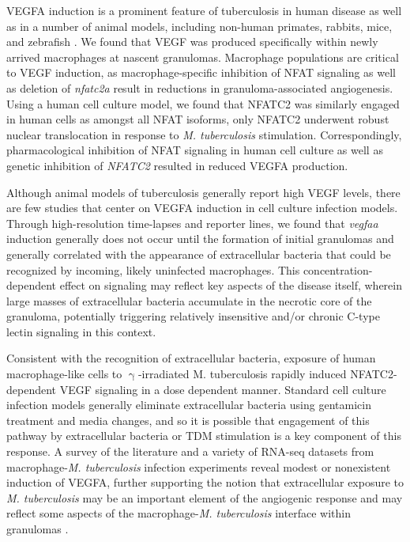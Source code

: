 VEGFA induction is a prominent feature of tuberculosis in human disease as well as in a number of animal models, including non-human primates, rabbits, mice, and zebrafish \citep{Datta2015, Oehlers2015, Polena2016, Harding2019, Cronan2021, Gideon2022}. We found that VEGF was produced specifically within newly arrived macrophages at nascent granulomas. Macrophage populations are critical to VEGF induction, as macrophage-specific inhibition of NFAT signaling as well as deletion of \textit{nfatc2a} result in reductions in granuloma-associated angiogenesis. Using a human cell culture model, we found that NFATC2 was similarly engaged in human cells as amongst all NFAT isoforms, only NFATC2 underwent robust nuclear translocation in response to \textit{M. tuberculosis} stimulation. Correspondingly, pharmacological inhibition of NFAT signaling in human cell culture as well as genetic inhibition of \textit{NFATC2} resulted in reduced VEGFA production.

Although animal models of tuberculosis generally report high VEGF levels, there are few studies that center on VEGFA induction in cell culture infection models. Through high-resolution time-lapses and reporter lines, we found that \textit{vegfaa} induction generally does not occur until the formation of initial granulomas and generally correlated with the appearance of extracellular bacteria that could be recognized by incoming, likely uninfected macrophages. This concentration-dependent effect on signaling may reflect key aspects of the disease itself, wherein large masses of extracellular bacteria accumulate in the necrotic core of the granuloma, potentially triggering relatively insensitive and/or chronic C-type lectin signaling in this context.

Consistent with the recognition of extracellular bacteria, exposure of human macrophage-like cells to $\upgamma$-irradiated M. tuberculosis rapidly induced NFATC2-dependent VEGF signaling in a dose dependent manner. Standard cell culture infection models generally eliminate extracellular bacteria using gentamicin treatment and media changes, and so it is possible that engagement of this pathway by extracellular bacteria or TDM stimulation is a key component of this response. A survey of the literature and a variety \citep{Lee2019, Pisu2020, Hall2021, Looney2021, Pu2021} of RNA-seq datasets from macrophage-\textit{M. tuberculosis} infection experiments reveal modest or nonexistent induction of VEGFA, further supporting the notion that extracellular exposure to \textit{M. tuberculosis} may be an important element of the angiogenic response and may reflect some aspects of the macrophage-\textit{M. tuberculosis} interface within granulomas \citep{Orme2014b}.

